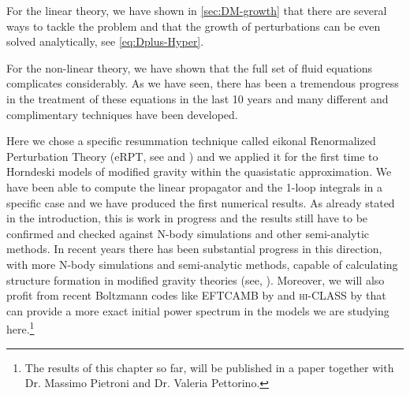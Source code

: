 For the linear theory, we have shown in \cref{sec:DM-growth} that there are several
ways to tackle the problem and that the growth of perturbations can be even solved analytically, see
\cref{eq:Dplus-Hyper}.

For the non-linear theory, we have shown that the full set of fluid equations complicates considerably.
As we have seen, there has been a tremendous progress in the treatment of these equations in the last 10 years and many different
and complimentary techniques have been developed.

Here we chose a specific resummation technique called eikonal Renormalized Perturbation Theory (eRPT, see \cite{anselmi_nonlinear_2012} and
) and we applied it for the first time 
to Horndeski models of modified gravity within the quasistatic approximation.
We have been able to compute the linear propagator and the 1-loop integrals in a specific case and we have 
produced the first numerical results. As already stated in the introduction, this is work in progress and the results
still have to be confirmed and checked against N-body simulations and other semi-analytic methods.
In recent years there has been substantial progress in this direction, with more N-body simulations and semi-analytic
methods, capable of calculating structure formation in modified gravity theories (see, ).
Moreover, we will also profit from recent Boltzmann codes like \textsc{EFTCAMB} by \cite{hu_eftcamb/eftcosmomc:_2014-1} and 
\textsc{hi-CLASS} by \cite{zumalacarregui} that can provide a more exact initial power spectrum in the models
we are studying here.\footnote{The results of this chapter so far, will be published in a paper together with Dr. Massimo Pietroni and
Dr. Valeria Pettorino.}





